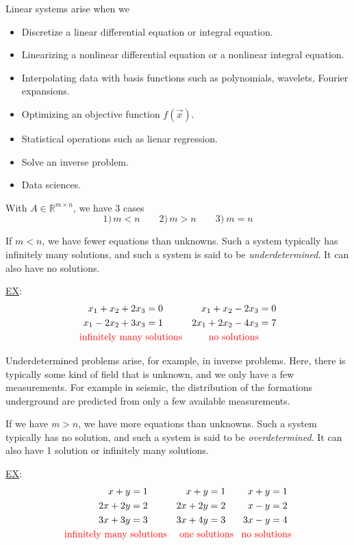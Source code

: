 \documentclass{article}
\begin{document}
Linear systems arise when we 
\begin{itemize}[label={--}]
    \item Discretize a linear differential equation or integral equation.
    \item Linearizing a nonlinear differential equation or a nonlinear integral equation.
    \item Interpolating data with basis functions such as polynomials, wavelets, Fourier expansions.
    \item Optimizing an objective function $f(\Vec{x})$. 
    \item Statistical operations such as lienar regression. 
    \item Solve an inverse problem. 
    \item Data sciences.
\end{itemize}

With $A\in\mathbb{R}^{m\times n}$, we have 3 cases
\begin{equation*}
    1)\, m < n \qquad 2)\, m > n \qquad 3)\ m=n
\end{equation*}

If $m<n$, we have fewer equations than unknowns. Such a system typically has infinitely many solutions, and such a system is said to be \emph{underdetermined}. It can also have no solutions. 

\underline{EX}:
\begin{align*}
    x_1 + x_2 + 2x_3 &= 0 & x_1 + x_2 - 2x_3 &= 0\\
    x_1 - 2x_2 + 3x_3 &= 1 & 2x_1 +2x_2 - 4x_3&=7\\
    \text{\textcolor{red}{infinitely many }}&\text{\textcolor{red}{solutions}}
    & \text{\textcolor{red}{no solutions}}
\end{align*}

Underdetermined problems arise, for example, in inverse problems. Here, there is typically some kind of field that is unknown, and we only have a few measurements. For example in seismic, the distribution of the formations underground are predicted from only a few available measurements. 

If we have $m>n$, we have more equations than unknowns. Such a system typically has no solution, and such a system is said to be \emph{overdetermined}. It can also have 1 solution or infinitely many solutions. 


\underline{EX}:
\begin{align*}
    x+y&=1 & x+y&=1 & x+y&=1 \\
    2x+2y&=2 & 2x+2y&=2 & x-y&=2 \\
    3x+3y&=3 & 3x+4y&=3 & 3x-y&=4 \\
    \text{\textcolor{red}{infinitely many }}&\text{\textcolor{red}{solutions}}
    & &\hspace{-3em}\text{\textcolor{red}{one solutions}}
    & &\hspace{-3em}\text{\textcolor{red}{no solutions}}
\end{align*}
\end{document}
